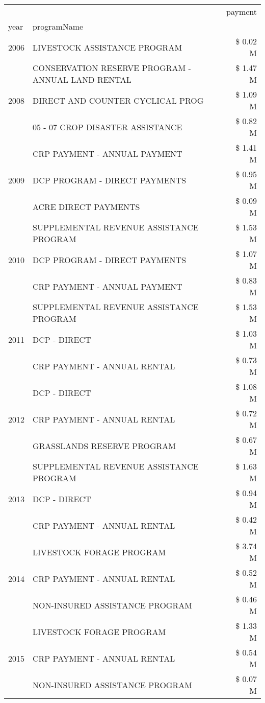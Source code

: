 \begin{tabular}{llr}
\toprule
 &  & payment \\
year & programName &  \\
\midrule
2006 & LIVESTOCK ASSISTANCE PROGRAM & \$ 0.02 M \\
\cline{1-3}
\multirow[t]{3}{*}{2008} & CONSERVATION RESERVE PROGRAM - ANNUAL LAND RENTAL & \$ 1.47 M \\
 & DIRECT AND COUNTER CYCLICAL PROG & \$ 1.09 M \\
 & 05 - 07 CROP DISASTER ASSISTANCE & \$ 0.82 M \\
\cline{1-3}
\multirow[t]{3}{*}{2009} & CRP PAYMENT - ANNUAL PAYMENT & \$ 1.41 M \\
 & DCP PROGRAM - DIRECT PAYMENTS & \$ 0.95 M \\
 & ACRE DIRECT PAYMENTS & \$ 0.09 M \\
\cline{1-3}
\multirow[t]{3}{*}{2010} & SUPPLEMENTAL REVENUE ASSISTANCE PROGRAM & \$ 1.53 M \\
 & DCP PROGRAM - DIRECT PAYMENTS & \$ 1.07 M \\
 & CRP PAYMENT - ANNUAL PAYMENT & \$ 0.83 M \\
\cline{1-3}
\multirow[t]{3}{*}{2011} & SUPPLEMENTAL REVENUE ASSISTANCE PROGRAM & \$ 1.53 M \\
 & DCP - DIRECT & \$ 1.03 M \\
 & CRP PAYMENT - ANNUAL RENTAL & \$ 0.73 M \\
\cline{1-3}
\multirow[t]{3}{*}{2012} & DCP - DIRECT & \$ 1.08 M \\
 & CRP PAYMENT - ANNUAL RENTAL & \$ 0.72 M \\
 & GRASSLANDS RESERVE PROGRAM & \$ 0.67 M \\
\cline{1-3}
\multirow[t]{3}{*}{2013} & SUPPLEMENTAL REVENUE ASSISTANCE PROGRAM & \$ 1.63 M \\
 & DCP - DIRECT & \$ 0.94 M \\
 & CRP PAYMENT - ANNUAL RENTAL & \$ 0.42 M \\
\cline{1-3}
\multirow[t]{3}{*}{2014} & LIVESTOCK FORAGE PROGRAM & \$ 3.74 M \\
 & CRP PAYMENT - ANNUAL RENTAL & \$ 0.52 M \\
 & NON-INSURED ASSISTANCE PROGRAM & \$ 0.46 M \\
\cline{1-3}
\multirow[t]{3}{*}{2015} & LIVESTOCK FORAGE PROGRAM & \$ 1.33 M \\
 & CRP PAYMENT - ANNUAL RENTAL & \$ 0.54 M \\
 & NON-INSURED ASSISTANCE PROGRAM & \$ 0.07 M \\

\end{tabular}
